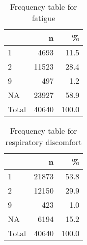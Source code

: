 \documentclass[
]{article}
\newenvironment{Shaded}{\begin{snugshade}}{\end{snugshade}}
\newcommand{\DataTypeTok}[1]{\textcolor[rgb]{0.13,0.29,0.53}{#1}}
\newcommand{\DecValTok}[1]{\textcolor[rgb]{0.00,0.00,0.81}{#1}}
\newcommand{\KeywordTok}[1]{\textcolor[rgb]{0.13,0.29,0.53}{\textbf{#1}}}
\newcommand{\NormalTok}[1]{#1}
\newcommand{\OperatorTok}[1]{\textcolor[rgb]{0.81,0.36,0.00}{\textbf{#1}}}
\newcommand{\OtherTok}[1]{\textcolor[rgb]{0.56,0.35,0.01}{#1}}
\newcommand{\StringTok}[1]{\textcolor[rgb]{0.31,0.60,0.02}{#1}}
\begin{document}
\begin{table}[!h]

\caption{\label{tab:unnamed-chunk-55}Frequency table for fatigue}
\centering
\begin{tabular}[t]{l|r|r}
\hline
  & n & \%\\
\hline
1 & 4693 & 11.5\\
\hline
2 & 11523 & 28.4\\
\hline
9 & 497 & 1.2\\
\hline
NA & 23927 & 58.9\\
\hline
Total & 40640 & 100.0\\
\hline
\end{tabular}
\end{table}

\begin{Shaded}
\end{Shaded}

\begin{table}[!h]

\caption{\label{tab:unnamed-chunk-56}Frequency table for respiratory discomfort}
\centering
\begin{tabular}[t]{l|r|r}
\hline
  & n & \%\\
\hline
1 & 21873 & 53.8\\
\hline
2 & 12150 & 29.9\\
\hline
9 & 423 & 1.0\\
\hline
NA & 6194 & 15.2\\
\hline
Total & 40640 & 100.0\\
\hline
\end{tabular}
\end{table}
\end{document}

